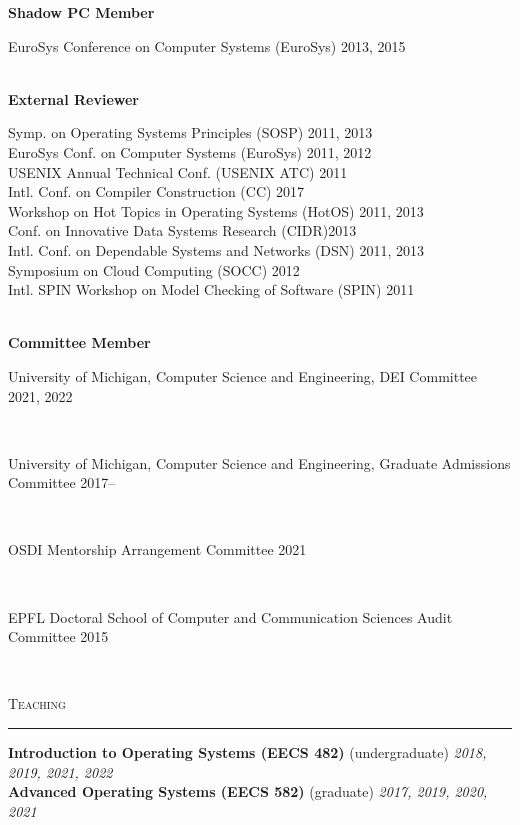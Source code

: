 \documentclass[10pt]{article}
\newcommand{\mysec}[1]{\vspace{2em}\textsc{\large #1}\vspace{1mm}\hrule\vspace{2mm}}
\newcommand{\mysub}[3]{\textbf{#1} {#2} \hfill {\em #3}}
\newcommand{\myssub}[1]{\hspace*{2mm}\parbox{163mm}{#1}\vspace*{2mm}}
\begin{document}
\mysub{Shadow PC Member}{}{} \\ 
\myssub{\vspace{2mm}EuroSys Conference on Computer Systems (EuroSys) \hfill 2013, 2015} \\

\mysub{External Reviewer}{}{} \\ 
\myssub{\vspace{2mm}Symp. on Operating Systems Principles (SOSP) \hfill 2011, 2013 \\
EuroSys Conf. on Computer Systems (EuroSys) \hfill 2011, 2012 \\
USENIX Annual Technical Conf. (USENIX ATC) \hfill 2011 \\
Intl. Conf. on Compiler Construction (CC) \hfill 2017 \\
Workshop on Hot Topics in Operating Systems (HotOS) \hfill 2011, 2013 \\
Conf. on Innovative Data Systems Research (CIDR)\hfill 2013\\
Intl. Conf. on Dependable Systems and Networks (DSN) \hfill 2011, 2013 \\
Symposium on Cloud Computing (SOCC) \hfill 2012 \\
Intl. SPIN Workshop on Model Checking of Software (SPIN) \hfill 2011} \\

\mysub{Committee Member}{}{} \\
\myssub{\vspace{2mm}University of Michigan, Computer Science and Engineering, DEI Committee \hfill 2021, 2022}\\
\myssub{\vspace{2mm}University of Michigan, Computer Science and Engineering, Graduate Admissions Committee \hfill 2017--}\\
\myssub{\vspace{2mm}OSDI Mentorship Arrangement Committee \hfill 2021}\\
\myssub{\vspace{2mm}EPFL Doctoral School of Computer and Communication Sciences Audit Committee \hfill 2015}\\

\newpage

\mysec{Teaching}
\mysub{Introduction to Operating Systems (EECS 482)}{(undergraduate)}{\rm 2018, 2019, 2021, 2022\vspace{2mm}} \\
\mysub{Advanced Operating Systems (EECS 582)}{(graduate)}{\rm 2017, 2019, 2020, 2021\vspace{2mm}} 
\end{document}
